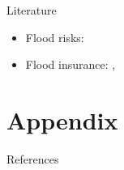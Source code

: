 \documentclass[xcolor=dvipsnames, aspectratio = 169]{beamer}
\begin{document}
{\begin{frame}{Literature}
    \begin{itemize}
        \item Flood risks: \citet{bakkensen2022}
        \item Flood insurance: \citet{hennighausen2023}, \citet{collier2023}
    \end{itemize}
\end{frame}

\appendix

\section{Appendix}



\begin{frame}[allowframebreaks]{References}
	\small
	
	
\end{frame}

}



\end{document}
